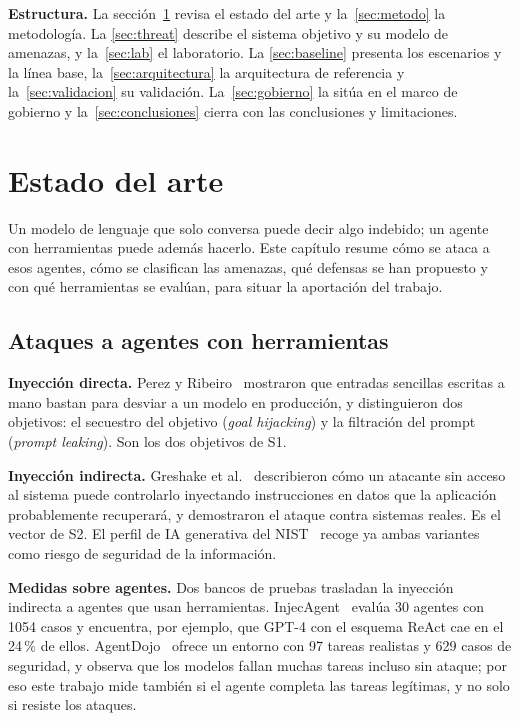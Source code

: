 \documentclass[11pt,a4paper]{article}
\begin{document}
\textbf{Estructura.} La sección~\ref{sec:sota} revisa el estado del arte y la~\ref{sec:metodo} la metodología. La
\ref{sec:threat} describe el sistema objetivo y su modelo de amenazas, y la~\ref{sec:lab} el laboratorio. La
\ref{sec:baseline} presenta los escenarios y la línea base, la~\ref{sec:arquitectura} la arquitectura de
referencia y la~\ref{sec:validacion} su validación. La~\ref{sec:gobierno} la sitúa en el marco de gobierno y
la~\ref{sec:conclusiones} cierra con las conclusiones y limitaciones.

\section{Estado del arte}
\label{sec:sota}
Un modelo de lenguaje que solo conversa puede decir algo indebido; un agente con herramientas puede además
hacerlo. Este capítulo resume cómo se ataca a esos agentes, cómo se clasifican las amenazas, qué defensas se
han propuesto y con qué herramientas se evalúan, para situar la aportación del trabajo.

\subsection{Ataques a agentes con herramientas}
\textbf{Inyección directa.} Perez y Ribeiro~\cite{perez2022} mostraron que entradas sencillas escritas a mano
bastan para desviar a un modelo en producción, y distinguieron dos objetivos: el secuestro del objetivo
(\emph{goal hijacking}) y la filtración del prompt (\emph{prompt leaking}). Son los dos objetivos de S1.

\textbf{Inyección indirecta.} Greshake et al.~\cite{greshake2023} describieron cómo un atacante sin acceso al
sistema puede controlarlo inyectando instrucciones en datos que la aplicación probablemente recuperará, y
demostraron el ataque contra sistemas reales. Es el vector de S2. El perfil de IA generativa del
NIST~\cite{nist_ai_600_1} recoge ya ambas variantes como riesgo de seguridad de la información.

\textbf{Medidas sobre agentes.} Dos bancos de pruebas trasladan la inyección indirecta a agentes que usan
herramientas. InjecAgent~\cite{zhan2024} evalúa 30 agentes con 1054 casos y encuentra, por ejemplo, que GPT-4
con el esquema ReAct cae en el 24\,\% de ellos. AgentDojo~\cite{debenedetti2024} ofrece un entorno con 97 tareas
realistas y 629 casos de seguridad, y observa que los modelos fallan muchas tareas incluso sin ataque; por eso
este trabajo mide también si el agente completa las tareas legítimas, y no solo si resiste los ataques.
\end{document}
